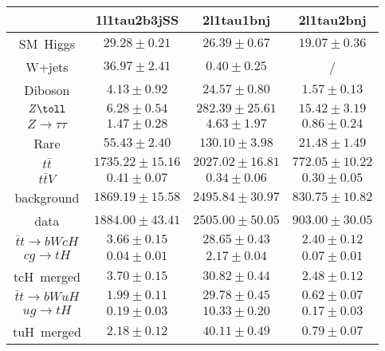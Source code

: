 \begin{tabular}{|c|c|c|c|} \hline
 & 1l1tau2b3jSS & 2l1tau1bnj & 2l1tau2bnj\\\hline
SM~Higgs & $29.28\pm0.21$ & $26.39\pm0.67$ & $19.07\pm0.36$\\\hline
W+jets & $36.97\pm2.41$ & $0.40\pm0.25$ &  /\\\hline
Diboson & $4.13\pm0.92$ & $24.57\pm0.80$ & $1.57\pm0.13$\\\hline
$Z\toll$ & $6.28\pm0.54$ & $282.39\pm25.61$ & $15.42\pm3.19$\\\hline
$Z\to\tau\tau$ & $1.47\pm0.28$ & $4.63\pm1.97$ & $0.86\pm0.24$\\\hline
Rare & $55.43\pm2.40$ & $130.10\pm3.98$ & $21.48\pm1.49$\\\hline
$t\bar{t}$ & $1735.22\pm15.16$ & $2027.02\pm16.81$ & $772.05\pm10.22$\\\hline
$t\bar{t}V$ & $0.41\pm0.07$ & $0.34\pm0.06$ & $0.30\pm0.05$\\\hline
background & $1869.19\pm15.58$ & $2495.84\pm30.97$ & $830.75\pm10.82$\\\hline
data & $1884.00\pm43.41$ & $2505.00\pm50.05$ & $903.00\pm30.05$\\\hline
$\bar{t}t\to bWcH$ & $3.66\pm0.15$ & $28.65\pm0.43$ & $2.40\pm0.12$\\\hline
$cg\to tH$ & $0.04\pm0.01$ & $2.17\pm0.04$ & $0.07\pm0.01$\\\hline
tcH~merged & $3.70\pm0.15$ & $30.82\pm0.44$ & $2.48\pm0.12$\\\hline
$\bar{t}t\to bWuH$ & $1.99\pm0.11$ & $29.78\pm0.45$ & $0.62\pm0.07$\\\hline
$ug\to tH$ & $0.19\pm0.03$ & $10.33\pm0.20$ & $0.17\pm0.03$\\\hline
tuH~merged & $2.18\pm0.12$ & $40.11\pm0.49$ & $0.79\pm0.07$\\\hline
\end{tabular}
